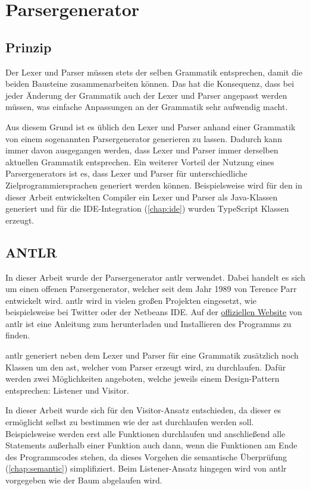 \section{Parsergenerator}
\subsection{Prinzip}
Der Lexer und Parser müssen stets der selben Grammatik entsprechen, damit die beiden Bausteine zusammenarbeiten können. Das hat die Konsequenz, dass bei jeder Änderung der Grammatik auch der Lexer und Parser angepasst werden müssen, was einfache Anpassungen an der Grammatik sehr aufwendig macht.

Aus diesem Grund ist es üblich den Lexer und Parser anhand einer Grammatik von einem sogenannten Parsergenerator generieren zu lassen. Dadurch kann immer davon ausgegangen werden, dass Lexer und Parser immer derselben aktuellen Grammatik entsprechen. Ein weiterer Vorteil der Nutzung eines Parsergenerators ist es, dass Lexer und Parser für unterschiedliche Zielprogrammiersprachen generiert werden können. Beispielsweise wird für den in dieser Arbeit entwickelten Compiler ein Lexer und Parser als Java-Klassen generiert und für die IDE-Integration (\cref{chap:ide})  wurden TypeScript Klassen erzeugt.  

\subsection{ANTLR} \label{subsec:antlr}
In dieser Arbeit wurde der Parsergenerator \ac{antlr} verwendet. Dabei handelt es sich um einen offenen Parsergenerator, welcher seit dem Jahr 1989 von Terence Parr entwickelt wird. \ac{antlr} wird in vielen großen Projekten eingesetzt, wie beispielsweise bei Twitter oder der Netbeans IDE. \cite{TerenceParr2022} Auf der \href{}{offiziellen Website} von \ac{antlr} ist eine Anleitung zum herunterladen und Installieren des Programms zu finden. 

\ac{antlr} generiert neben dem Lexer und Parser für eine Grammatik zusätzlich noch Klassen um den \ac{ast}, welcher vom Parser erzeugt wird, zu durchlaufen. Dafür werden zwei Möglichkeiten angeboten, welche jeweils einem Design-Pattern entsprechen: Listener und Visitor.

In dieser Arbeit wurde sich für den Visitor-Ansatz entschieden, da dieser es ermöglicht selbst zu bestimmen wie der \ac{ast} durchlaufen werden soll. Beispielsweise werden erst alle Funktionen durchlaufen und anschließend alle Statements außerhalb einer Funktion auch dann, wenn die Funktionen am Ende des Programmcodes stehen, da dieses Vorgehen die semantische Überprüfung (\cref{chap:semantic}) simplifiziert. Beim Listener-Ansatz hingegen wird von \ac{antlr} vorgegeben wie der Baum abgelaufen wird.

